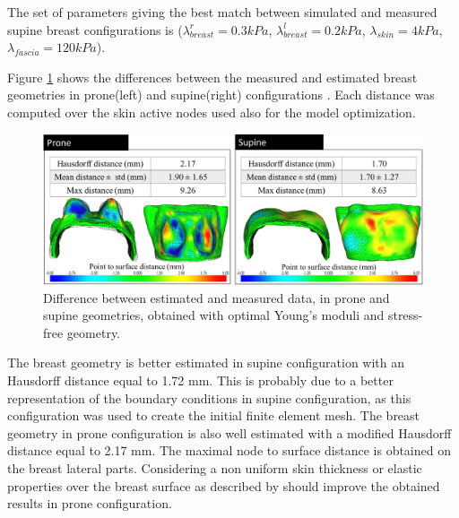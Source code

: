 The set of parameters giving the best match between simulated and measured supine breast configurations is ($\lambda_{breast}^r=0.3 kPa$, $\lambda_{breast}^l=0.2 kPa$, $\lambda_{skin}=4 kPa$, $\lambda_{fascia}=120 kPa$).  

Figure \ref{fig:optimizationresults} shows the differences between the measured and estimated breast geometries in prone(left) and supine(right) configurations . Each distance was computed over the skin active nodes used also for the model optimization. 

\begin{figure}[!h]
\centering
\includegraphics[width=\textwidth,keepaspectratio]{figures/optimizationresults.png} 
\caption{Difference  between estimated and measured data, in prone and supine geometries, obtained with optimal Young's moduli and stress-free geometry. }\label{fig:optimizationresults}
\end{figure}

The breast geometry is better estimated in supine configuration with an Hausdorff distance equal to 1.72 mm. This is probably due to a better representation of the boundary conditions in supine configuration, as this configuration was used to create the initial finite element mesh. The breast geometry in prone configuration is also well estimated with a modified Hausdorff distance equal to 2.17 mm. The maximal node to surface distance is obtained on the breast lateral parts.  Considering a non uniform skin thickness or elastic properties over the breast surface as described by \cite{sutradhar_vivo_2013} should improve the obtained results in prone configuration. 




